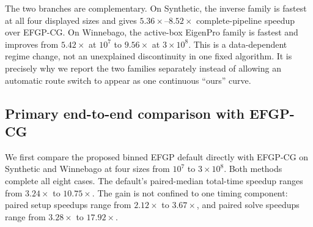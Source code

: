 The two branches are complementary.  On Synthetic, the inverse family is
fastest at all four displayed sizes and gives $5.36\times$--$8.52\times$
complete-pipeline speedup over EFGP-CG.  On Winnebago, the active-box
EigenPro family is fastest and improves from $5.42\times$ at $10^7$ to
$9.56\times$ at $3\times10^8$.  This is a data-dependent regime change,
not an unexplained discontinuity in one fixed algorithm.  It is precisely why
we report the two families separately instead of allowing an automatic route
switch to appear as one continuous ``ours'' curve.

\iffalse
\subsection{Primary end-to-end comparison with EFGP-CG}
\label{subsec:end-to-end-krr}

We first compare the proposed binned EFGP default directly with EFGP-CG on
Synthetic and Winnebago at four sizes from \(10^7\) to \(3\times10^8\).
Both methods complete all eight cases.  The default's paired-median total-time
speedup ranges from \(3.24\times\) to \(10.75\times\).  The gain is not
confined to one timing component: paired setup speedups range from
\(2.12\times\) to \(3.67\times\), and paired solve speedups range from
\(3.28\times\) to \(17.92\times\).

